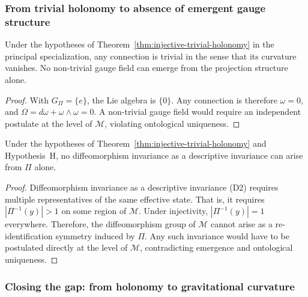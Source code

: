   \subsubsection*{From trivial holonomy to absence of emergent gauge structure}
    \label{subsec:stepA-gauge}

    \begin{corollary}
      \label{cor:no-gauge}
      Under the hypotheses of Theorem~\ref{thm:injective-trivial-holonomy} in the principal specialization,
      any connection is trivial in the sense that its curvature vanishes.
      No non-trivial gauge field can emerge from the projection structure alone.
    \end{corollary}

    \begin{proof}
      With $G_\Pi = \{e\}$, the Lie algebra is $\{0\}$.
      Any connection is therefore $\omega = 0$, and $\Omega = d\omega + \omega \wedge \omega = 0$.
      A non-trivial gauge field would require an independent postulate at the level of $\mathcal{M}$,
      violating ontological uniqueness.
    \end{proof}

    \begin{corollary}
      \label{cor:no-diffeo}
      Under the hypotheses of Theorem~\ref{thm:injective-trivial-holonomy} and Hypothesis~H,
      no diffeomorphism invariance as a descriptive invariance can arise from $\Pi$ alone.
    \end{corollary}

    \begin{proof}
      Diffeomorphism invariance as a descriptive invariance (D2) requires multiple representatives of the same effective state.
      That is, it requires $|\Pi^{-1}(y)|>1$ on some region of $\mathcal{M}$.
      Under injectivity, $|\Pi^{-1}(y)| = 1$ everywhere.
      Therefore, the diffeomorphism group of $\mathcal{M}$ cannot arise as a re-identification symmetry induced by $\Pi$.
      Any such invariance would have to be postulated directly at the level of $\mathcal{M}$,
      contradicting emergence and ontological uniqueness.
    \end{proof}

  \subsubsection*{Closing the gap: from holonomy to gravitational curvature}
    \label{subsec:stepA-curvature}

